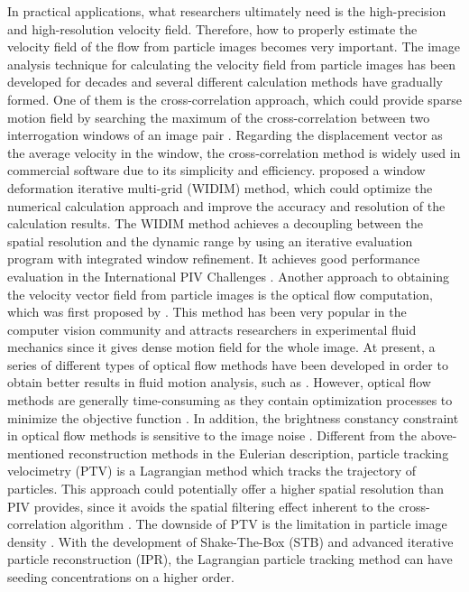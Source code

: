 \documentclass[%
 aip,
 amsmath,amssymb,
 reprint,%
]{revtex4-1}
\begin{document}
In practical applications, what researchers ultimately need is the high-precision and high-resolution velocity field. 
Therefore, how to properly estimate the velocity field of the flow from particle images becomes very important. 
The image analysis technique for calculating the velocity field from particle images has been developed for decades and several different calculation methods have gradually formed.
One of them is the cross-correlation approach, which could provide sparse motion field by searching the maximum of the cross-correlation between two interrogation windows of an image pair \citep{Raffel2007,Adrian2011,Westerweel1999}.
Regarding the displacement vector as the average velocity in the window, the cross-correlation method is widely used in commercial software due to its simplicity and efficiency.
\citet{Scarano2001} proposed a window deformation iterative multi-grid (WIDIM) method, which could optimize the numerical calculation approach and improve the accuracy and resolution of the calculation results. 
The WIDIM method achieves a decoupling between the spatial resolution and the dynamic range by using an iterative evaluation program with integrated window refinement. It achieves good performance evaluation in the International PIV Challenges \citep{Stanislas}.
Another approach to obtaining the velocity vector field from particle images is the optical flow computation, which was first proposed by \citet{Horn1981}.
This method has been very popular in the computer vision community and attracts researchers in experimental fluid mechanics since it gives dense motion field for the whole image. 
At present, a series of different types of optical flow methods have been developed in order to obtain better results in fluid motion analysis, such as \citet{Corpetti2002,Ruhnau2007,Zhong2017,lu2021accurate}.
However, optical flow methods are generally time-consuming as they contain optimization processes to minimize the objective function \citep{cai2019,cai2019particle}. In addition, the brightness constancy constraint in optical flow methods is sensitive to the image noise \citep{cai2019particle}.
Different from the above-mentioned reconstruction methods in the Eulerian description, particle tracking velocimetry (PTV) is a Lagrangian method which tracks the trajectory of particles. 
This approach could potentially offer a higher spatial resolution than PIV provides, since it avoids the spatial filtering effect inherent to the cross-correlation algorithm \citep{Schneiders2016}. 
The downside of PTV is the limitation in particle image density \citep{Schneiders2016,Schanz2016}.
With the development of Shake-The-Box (STB)\citep{Schanz2016} and advanced iterative particle reconstruction (IPR)\citep{Wieneke}, the Lagrangian particle tracking method can have seeding concentrations on a higher order. 
\end{document}
